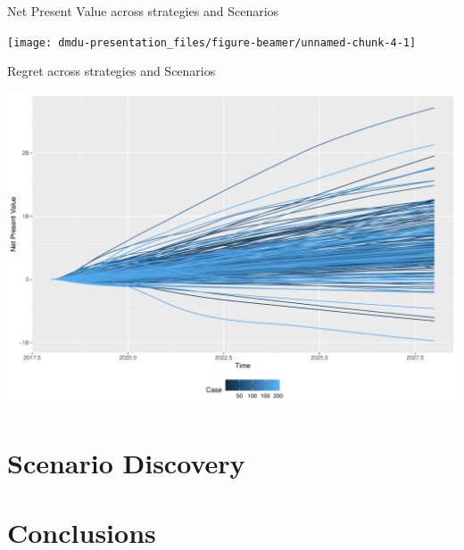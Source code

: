 \documentclass[12pt,ignorenonframetext,]{beamer}
\begin{document}
\begin{frame}{Net Present Value across strategies and Scenarios}
\protect\hypertarget{net-present-value-across-strategies-and-scenarios}{}

\begin{center}\texttt{[image: dmdu-presentation\_files/figure-beamer/unnamed-chunk-4-1]} \end{center}

\end{frame}

\begin{frame}{Regret across strategies and Scenarios}
\protect\hypertarget{regret-across-strategies-and-scenarios}{}

\begin{center}\includegraphics{dmdu-presentation_files/figure-beamer/unnamed-chunk-5-1} \end{center}

\end{frame}

\hypertarget{scenario-discovery}{%
\section{Scenario Discovery}\label{scenario-discovery}}

\hypertarget{conclusions}{%
\section{Conclusions}\label{conclusions}}
\end{document}
